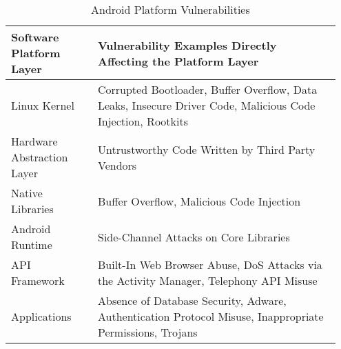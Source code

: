 \begin{table*}[tbp]
    \normalsize
    \centering
    \caption{Android Platform Vulnerabilities}
    \label{tab:AndoridPlatVuln}
    \begin{tabular}{p{0.25\linewidth}p{0.7\linewidth}}
    \hline
    \hline
    Software Platform Layer    & Vulnerability Examples Directly Affecting the Platform Layer                                                \\ \hline
    Linux Kernel               & Corrupted Bootloader, Buffer Overflow, Data Leaks, Insecure Driver Code, Malicious Code Injection, Rootkits \\
    Hardware Abstraction Layer & Untrustworthy Code Written by Third Party Vendors                                                           \\
    Native Libraries           & Buffer Overflow, Malicious Code Injection                                                                   \\
    Android Runtime            & Side-Channel Attacks on Core Libraries                                                                      \\
    API Framework              & Built-In Web Browser Abuse, DoS Attacks via the Activity Manager, Telephony API Misuse                      \\
    Applications               & Absence of Database Security, Adware, Authentication Protocol Misuse, Inappropriate Permissions, Trojans    \\
    \hline
    \hline
    \end{tabular}
\end{table*}
